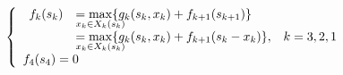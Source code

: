 \documentclass{article}
\begin{document}
\large

\begin{align*}\left\{\begin{array}{ll}
\begin{array}{lll}f_{k}(s_{k})&=\max\limits_{\mathclap{x_k\in X_k(s_k)}}\{ g_k(s_k,x_k)+f_{k+1} (s_{k+1}) \}& \\
&=\max\limits_{\mathclap{x_k\in X_k(s_k)}}\{ g_k(s_k,x_k)+f_{k+1}(s_k-x_k) \},&k=3,2,1 \end{array}\\
f_{4}( s_{4} )=0
\end{array}\right.
\end{align*}
\end{document}
